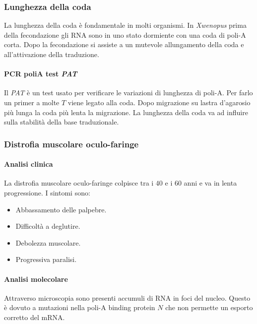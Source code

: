 		\subsubsection{Lunghezza della coda}
		La lunghezza della coda \`e fondamentale in molti organismi.
		In \emph{Xwenopus} prima della fecondazione gli RNA sono in uno stato dormiente con una coda di poli-A corta.
		Dopo la fecondazione si assiste a un mutevole allungamento della coda e all'attivazione della traduzione.

			\paragraph{PCR poliA test \emph{PAT}}
			Il \emph{PAT} \`e un test usato per verificare le variazioni di lunghezza di poli-A.
			Per farlo un primer a molte $T$ viene legato alla coda.
			Dopo migrazione su lastra d'agarosio pi\`u lunga la coda pi\`u lenta la migrazione.
			La lunghezza della coda va ad influire sulla stabilit\`a della base traduzionale.

		\subsubsection{Distrofia muscolare oculo-faringe}
	
			\paragraph{Analisi clinica}
			La distrofia muscolare oculo-faringe colpisce tra i $40$ e i $60$ anni e va in lenta progressione.
			I sintomi sono:
			\begin{multicols}{2}
				\begin{itemize}
					\item Abbassamento delle palpebre.
					\item Difficolt\`a a deglutire.
					\item Debolezza muscolare.
					\item Progressiva paralisi.
				\end{itemize}
			\end{multicols}

			\paragraph{Analisi molecolare}
			Attraverso microscopia sono presenti accumuli di RNA in foci del nucleo.
			Questo \`e dovuto a mutazioni nella poli-A binding protein $N$ che non permette un esporto corretto del mRNA.

